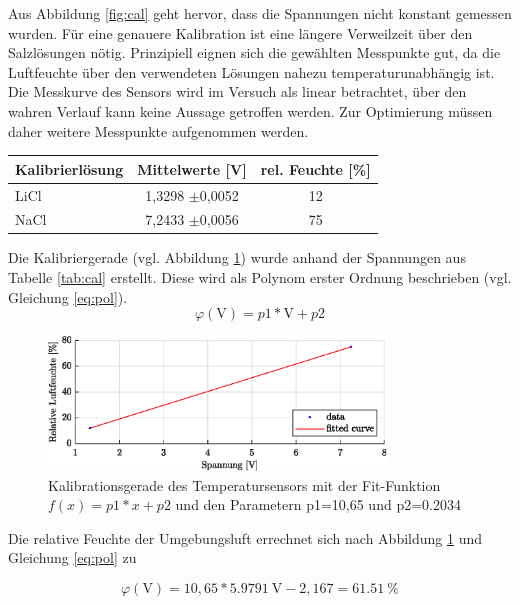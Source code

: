 Aus Abbildung \ref{fig:cal} geht hervor, dass die Spannungen nicht konstant gemessen wurden. Für eine genauere Kalibration ist eine längere Verweilzeit über den Salzlösungen nötig. Prinzipiell eignen sich die gewählten Messpunkte gut, da die Luftfeuchte über den verwendeten Lösungen nahezu temperaturunabhängig ist. Die Messkurve des Sensors wird im Versuch als linear betrachtet, über den wahren Verlauf kann keine Aussage getroffen werden. Zur Optimierung müssen daher weitere Messpunkte aufgenommen werden.
\begin{center}
	\begin{tabular}{l|c|c}
		\label{tab:cal}
		
		\textbf{Kalibrierlösung} & \textbf{Mittelwerte} [V] & \textbf{rel. Feuchte} [\%]\\
		\hline
		LiCl & 1,3298 $\pm$0,0052 & 12\\
		NaCl & 7,2433 $\pm$0,0056 & 75
	\end{tabular}
\end{center}

Die Kalibriergerade (vgl. Abbildung \ref{fig:cal2}) wurde anhand der Spannungen aus Tabelle \ref{tab:cal} erstellt. Diese wird als Polynom erster Ordnung beschrieben (vgl. Gleichung \ref{eq:pol}).
\begin{equation}
	\label{eq:pol}
	\varphi(\text{V}) = p1*\text{V} + p2
\end{equation}

\begin{figure}[H]
	\centering
	\includegraphics[width=0.8\textwidth]{../DATA/Kalibriergerade_Feuchte.eps}
	\caption[Kalibrationsgerade des Temperatursensors]{Kalibrationsgerade des Temperatursensors mit der Fit-Funktion $f(x) = p1*x + p2$ und den Parametern p1=10,65 und p2=0.2034}
	\label{fig:cal2}
\end{figure}

Die relative Feuchte der Umgebungsluft errechnet sich nach Abbildung \ref{fig:cal2} und Gleichung \ref{eq:pol} zu

\begin{equation}
	\label{eq:cal}
	\varphi(\text{V})=10,65*\SI{5,9791}{\volt}-2,167=\SI{61,51}{\percent}
\end{equation}

